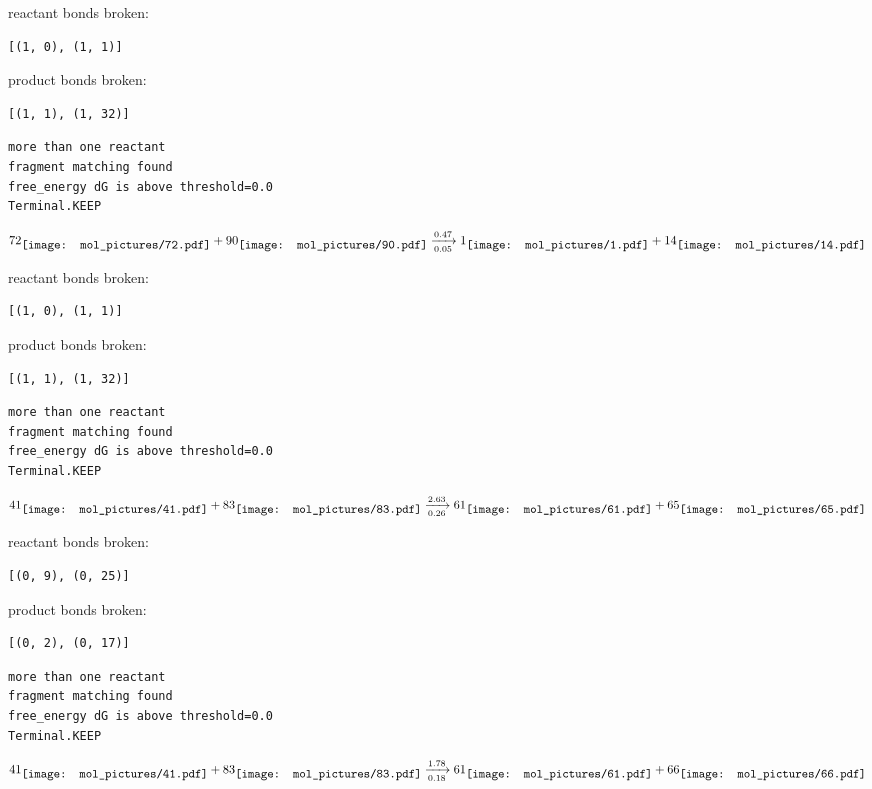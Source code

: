 \documentclass{article}
\begin{document}
reactant bonds broken:\begin{verbatim}
[(1, 0), (1, 1)]
\end{verbatim}
product bonds broken:\begin{verbatim}
[(1, 1), (1, 32)]
\end{verbatim}




\vspace{1cm}
\begin{verbatim}
more than one reactant
fragment matching found
free_energy dG is above threshold=0.0
Terminal.KEEP
\end{verbatim}
$$
72
\raisebox{-.5\height}{\texttt{[image: mol\_pictures/72.pdf]}}
+
90
\raisebox{-.5\height}{\texttt{[image: mol\_pictures/90.pdf]}}
\xrightarrow[0.05]{0.47}
1
\raisebox{-.5\height}{\texttt{[image: mol\_pictures/1.pdf]}}
+
14
\raisebox{-.5\height}{\texttt{[image: mol\_pictures/14.pdf]}}
$$


reactant bonds broken:\begin{verbatim}
[(1, 0), (1, 1)]
\end{verbatim}
product bonds broken:\begin{verbatim}
[(1, 1), (1, 32)]
\end{verbatim}




\vspace{1cm}
\begin{verbatim}
more than one reactant
fragment matching found
free_energy dG is above threshold=0.0
Terminal.KEEP
\end{verbatim}
$$
41
\raisebox{-.5\height}{\texttt{[image: mol\_pictures/41.pdf]}}
+
83
\raisebox{-.5\height}{\texttt{[image: mol\_pictures/83.pdf]}}
\xrightarrow[0.26]{2.63}
61
\raisebox{-.5\height}{\texttt{[image: mol\_pictures/61.pdf]}}
+
65
\raisebox{-.5\height}{\texttt{[image: mol\_pictures/65.pdf]}}
$$


reactant bonds broken:\begin{verbatim}
[(0, 9), (0, 25)]
\end{verbatim}
product bonds broken:\begin{verbatim}
[(0, 2), (0, 17)]
\end{verbatim}




\vspace{1cm}
\begin{verbatim}
more than one reactant
fragment matching found
free_energy dG is above threshold=0.0
Terminal.KEEP
\end{verbatim}
$$
41
\raisebox{-.5\height}{\texttt{[image: mol\_pictures/41.pdf]}}
+
83
\raisebox{-.5\height}{\texttt{[image: mol\_pictures/83.pdf]}}
\xrightarrow[0.18]{1.78}
61
\raisebox{-.5\height}{\texttt{[image: mol\_pictures/61.pdf]}}
+
66
\raisebox{-.5\height}{\texttt{[image: mol\_pictures/66.pdf]}}
$$
\end{document}
